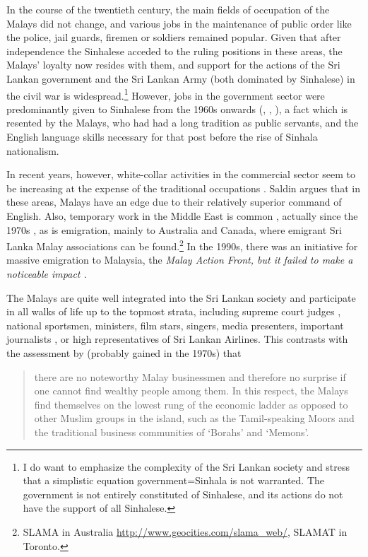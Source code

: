 In the course of the twentieth century, the main fields of occupation of the Malays did not change, and various jobs in the maintenance of public order like the police, jail guards, firemen or soldiers remained popular. Given that after independence the Sinhalese acceded to the ruling positions in these areas, the Malays' loyalty now resides with them, and support for the actions of the Sri Lankan government and the Sri Lankan Army (both dominated by Sinhalese) in the civil war is widespread.\footnote{I do want to emphasize the complexity of the Sri Lankan society and stress that a simplistic equation government=Sinhala is not warranted. The government is not entirely constituted of Sinhalese, and its actions do not have the support of all Sinhalese.} However, jobs in the government sector were predominantly given to   Sinhalese from the 1960s onwards (\citet[29,33f]{Bichsel},  \citet[37]{NissanEtAl1990}, \citet[55]{OsmanEtAl2008}), a fact which is resented by the Malays, who had had a long tradition as public servants, and the English language skills necessary for that post before the rise of Sinhala nationalism.

In recent years, however,  white-collar activities in the commercial sector seem to be increasing at the expense of the traditional occupations \citep[48]{Saldin2001}. Saldin argues that in these areas, Malays have an edge due to their relatively superior command of English. Also, temporary work in the Middle East is common \citep[34]{Bichsel}, actually since the 1970s \citep{Saldin2001,OsmanEtAl2008}, as is emigration, mainly to Australia and Canada, where emigrant Sri Lanka Malay associations can be found.\footnote{SLAMA in Australia \url{http://www.geocities.com/slama\_web/}, SLAMAT in Toronto.} In the 1990s, there was an initiative for massive emigration to Malaysia, the \em Malay Action Front\em, but it failed to make a noticeable impact \citep[45ff]{Saldin2001}.

The Malays are quite well integrated into the Sri Lankan society and participate in all walks of life up to the topmost strata, including supreme court judges \citep[24]{Nuhman2007}, national sportsmen, ministers, film stars, singers, media presenters, important journalists \citep[53]{OsmanEtAl2008}, or high representatives of Sri Lankan Airlines. This contrasts with the assessment by \citet{Hussainmiya1990} (probably gained in the 1970s) that

\begin{quote}
 there are no noteworthy Malay businessmen and therefore no surprise if one cannot find wealthy people among them. In this respect, the Malays find themselves on the lowest rung of the economic ladder as opposed to other Muslim groups in the island, such as the Tamil-speaking Moors and the traditional business communities of `Borahs' and `Memons'.
\end{quote}

